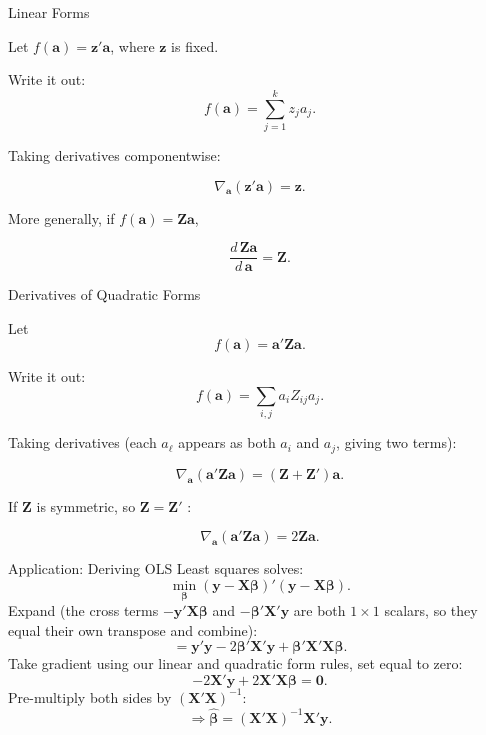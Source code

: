 \documentclass[aspectratio=169, handout, t]{beamer}
\numberwithin{equation}{section}
\begin{document}
\begin{frame}{Linear Forms}

Let $f(\bm{a}) = \bm{z}'\bm{a}$,
where $\bm{z}$ is fixed.

\vspace{0.3cm}

Write it out:
\[
f(\bm{a}) = \sum_{j=1}^k z_j a_j.
\]

\vspace{0.3cm}

Taking derivatives componentwise:\pause

\[
\nabla_{\bm{a}} (\bm{z}'\bm{a}) = \bm{z}.
\]

\vspace{0.5cm}\pause

More generally, if $f(\bm{a}) = \bm{Z}\bm{a}$,

\[
\dfrac{d\,\bm{Z}\bm{a}}{d\,\bm{a}} = \bm{Z}.
\]

\end{frame}

\begin{frame}{Derivatives of Quadratic Forms}

Let
\[
f(\bm{a}) = \bm{a}'\bm{Z}\bm{a}.
\]

\vspace{0.3cm}

Write it out:
\[
f(\bm{a}) = \sum_{i,j} a_i Z_{ij} a_j.
\]\pause

\vspace{0.4cm}

Taking derivatives (each $a_\ell$ appears as both $a_i$ and $a_j$, giving two terms):\pause

\[
\nabla_{\bm{a}} (\bm{a}'\bm{Z}\bm{a})
=
(\bm{Z} + \bm{Z}')\bm{a}.
\]

\vspace{0.3cm}\pause

If $\bm{Z}$ is symmetric, so $\bm{Z}=\bm{Z}'$ :

\[
\nabla_{\bm{a}} (\bm{a}'\bm{Z}\bm{a})
=
2\bm{Z}\bm{a}.
\]

\end{frame}

\begin{frame}{Application: Deriving OLS}
Least squares solves:
\[
\min_{\bm{\beta}}
(\bm{y} - \bm{X}\bm{\beta})'
(\bm{y} - \bm{X}\bm{\beta}).
\]\pause
Expand (the cross terms $-\bm{y}'\bm{X}\bm{\beta}$ and $-\bm{\beta}'\bm{X}'\bm{y}$ are both $1\times 1$ scalars, so they equal their own transpose and combine):
\[
=
\bm{y}'\bm{y}
- 2\bm{\beta}'\bm{X}'\bm{y}
+ \bm{\beta}'\bm{X}'\bm{X}\bm{\beta}.
\]\pause
Take gradient using our linear and quadratic form rules, set equal to zero:
\[
-2\bm{X}'\bm{y}
+ 2\bm{X}'\bm{X}\bm{\beta}
= \bm{0}.
\]\pause
Pre-multiply both sides by $(\bm{X}'\bm{X})^{-1}$:
\[
\Rightarrow
\hat{\bm{\beta}} =
(\bm{X}'\bm{X})^{-1}\bm{X}'\bm{y}.
\]
\end{frame}
\end{document}
